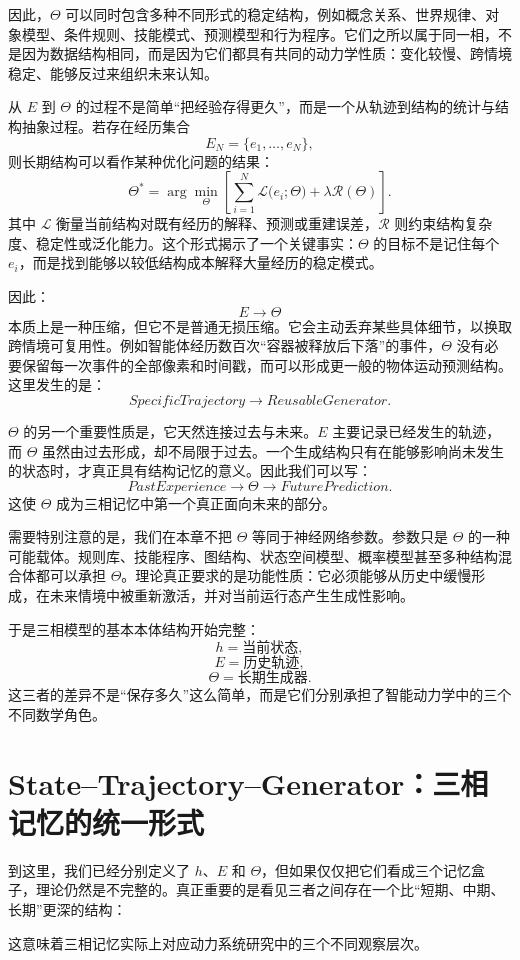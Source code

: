 因此，$\Theta$ 可以同时包含多种不同形式的稳定结构，例如概念关系、世界规律、对象模型、条件规则、技能模式、预测模型和行为程序。它们之所以属于同一相，不是因为数据结构相同，而是因为它们都具有共同的动力学性质：变化较慢、跨情境稳定、能够反过来组织未来认知。

从 $E$ 到 $\Theta$ 的过程不是简单“把经验存得更久”，而是一个从轨迹到结构的统计与结构抽象过程。若存在经历集合
\[
E_N
=
\{e_1,\ldots,e_N\},
\]
则长期结构可以看作某种优化问题的结果：
\[
\Theta^\ast
=
\arg\min_{\Theta}
\left[
\sum_{i=1}^{N}
\mathcal{L}
\bigl(
e_i;
\Theta
\bigr)
+
\lambda
\mathcal{R}(\Theta)
\right].
\]
其中 $\mathcal{L}$ 衡量当前结构对既有经历的解释、预测或重建误差，$\mathcal{R}$ 则约束结构复杂度、稳定性或泛化能力。这个形式揭示了一个关键事实：$\Theta$ 的目标不是记住每个 $e_i$，而是找到能够以较低结构成本解释大量经历的稳定模式。

因此：
\[
E
\rightarrow
\Theta
\]
本质上是一种压缩，但它不是普通无损压缩。它会主动丢弃某些具体细节，以换取跨情境可复用性。例如智能体经历数百次“容器被释放后下落”的事件，$\Theta$ 没有必要保留每一次事件的全部像素和时间戳，而可以形成更一般的物体运动预测结构。这里发生的是：
\[
SpecificTrajectory
\rightarrow
ReusableGenerator.
\]

$\Theta$ 的另一个重要性质是，它天然连接过去与未来。$E$ 主要记录已经发生的轨迹，而 $\Theta$ 虽然由过去形成，却不局限于过去。一个生成结构只有在能够影响尚未发生的状态时，才真正具有结构记忆的意义。因此我们可以写：
\[
PastExperience
\rightarrow
\Theta
\rightarrow
FuturePrediction.
\]
这使 $\Theta$ 成为三相记忆中第一个真正面向未来的部分。

需要特别注意的是，我们在本章不把 $\Theta$ 等同于神经网络参数。参数只是 $\Theta$ 的一种可能载体。规则库、技能程序、图结构、状态空间模型、概率模型甚至多种结构混合体都可以承担 $\Theta$。理论真正要求的是功能性质：它必须能够从历史中缓慢形成，在未来情境中被重新激活，并对当前运行态产生生成性影响。

于是三相模型的基本本体结构开始完整：
\[
h=\text{当前状态},
\]
\[
E=\text{历史轨迹},
\]
\[
\Theta=\text{长期生成器}.
\]
这三者的差异不是“保存多久”这么简单，而是它们分别承担了智能动力学中的三个不同数学角色。

\section{State--Trajectory--Generator：三相记忆的统一形式}

到这里，我们已经分别定义了 $h$、$E$ 和 $\Theta$，但如果仅仅把它们看成三个记忆盒子，理论仍然是不完整的。真正重要的是看见三者之间存在一个比“短期、中期、长期”更深的结构：
\begin{statementbox}
\centering
{}
\end{statementbox}
这意味着三相记忆实际上对应动力系统研究中的三个不同观察层次。

